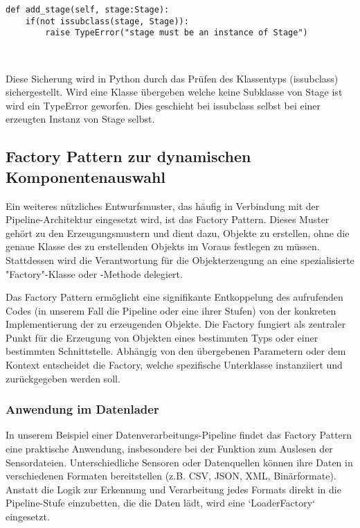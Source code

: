 \documentclass[a4paper]{article} %
\begin{document}
\begin{verbatim}
def add_stage(self, stage:Stage):
    if(not issubclass(stage, Stage)):
        raise TypeError("stage must be an instance of Stage")
\end{verbatim}\

Diese Sicherung wird in Python durch das Prüfen des Klassentyps (issubclass) sichergestellt. Wird eine Klasse übergeben welche keine Subklasse von Stage ist wird ein TypeError geworfen. Dies geschieht bei issubclass selbst bei einer erzeugten Instanz von Stage selbst.

\subsection{Factory Pattern zur dynamischen Komponentenauswahl}
Ein weiteres nützliches Entwurfsmuster, das häufig in Verbindung mit der Pipeline-Architektur eingesetzt wird, ist das Factory Pattern. Dieses Muster gehört zu den Erzeugungsmustern und dient dazu, Objekte zu erstellen, ohne die genaue Klasse des zu erstellenden Objekts im Voraus festlegen zu müssen. Stattdessen wird die Verantwortung für die Objekterzeugung an eine spezialisierte "Factory"-Klasse oder -Methode delegiert.

Das Factory Pattern ermöglicht eine signifikante Entkoppelung des aufrufenden Codes (in unserem Fall die Pipeline oder eine ihrer Stufen) von der konkreten Implementierung der zu erzeugenden Objekte. Die Factory fungiert als zentraler Punkt für die Erzeugung von Objekten eines bestimmten Typs oder einer bestimmten Schnittstelle. Abhängig von den übergebenen Parametern oder dem Kontext entscheidet die Factory, welche spezifische Unterklasse instanziiert und zurückgegeben werden soll.

\subsubsection{Anwendung im Datenlader}
In unserem Beispiel einer Datenverarbeitungs-Pipeline findet das Factory Pattern eine praktische Anwendung, insbesondere bei der Funktion zum Auslesen der Sensordateien. Unterschiedliche Sensoren oder Datenquellen können ihre Daten in verschiedenen Formaten bereitstellen (z.B. CSV, JSON, XML, Binärformate). Anstatt die Logik zur Erkennung und Verarbeitung jedes Formats direkt in die Pipeline-Stufe einzubetten, die die Daten lädt, wird eine `LoaderFactory` eingesetzt.
\end{document}
